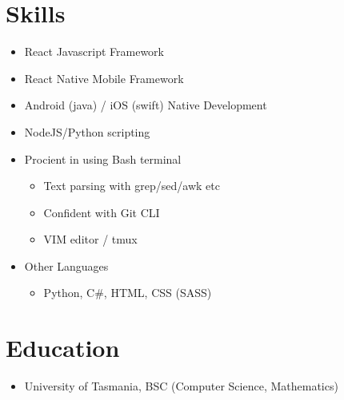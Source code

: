 \documentclass{article}
\begin{document}
\section{Skills}

\begin{itemize}
  \item React Javascript Framework
  \item React Native Mobile Framework
  \item Android (java) / iOS (swift) Native Development
  \item NodeJS/Python scripting

  \item Procient in using Bash terminal
  \begin{itemize}
    \item Text parsing with grep/sed/awk etc
    \item Confident with Git CLI
    \item VIM editor / tmux
  \end{itemize}

  \item Other Languages
  \begin{itemize}
    \item Python, C\#, HTML, CSS (SASS)
  \end{itemize}
\end{itemize}

\section{Education}
\begin{itemize}
  \item University of Tasmania, BSC (Computer Science, Mathematics)
\end{itemize}
\end{document}
